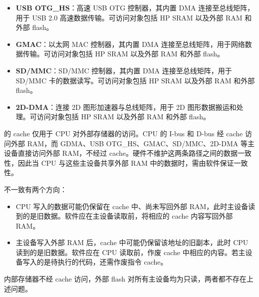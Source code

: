 \documentclass[main\_\_CN.tex]{subfiles}
\begin{document}
\begin{itemize}
\begin{itemize}
            \item \textbf{GDMA-AXI}：基于 AXI 总线协议的 DMA 控制器，可访问对象包括 HP SRAM 以及外部 RAM 和外部 flash。
        \end{itemize}
        GDMA 通过这些总线进行高速数据传输，包括外设到存储器、存储器到外设以及存储器到存储器的传输。针对 DMA 访问外部存储器的场景，为确保数据吞吐率，建议尽可能设置较长的 burst 长度。
    \item \textbf{USB OTG\_HS}：高速 USB OTG 控制器，其内置 DMA 连接至总线矩阵，用于 USB 2.0 高速数据传输。可访问对象包括 HP SRAM 以及外部 RAM 和外部 flash。
    \item \textbf{GMAC}：以太网 MAC 控制器，其内置 DMA 连接至总线矩阵，用于网络数据传输。可访问对象包括 HP SRAM 以及外部 RAM 和外部 flash。
    \item \textbf{SD/MMC}：SD/MMC 控制器，其内置 DMA 连接至总线矩阵，用于 SD/MMC 卡的数据读写。可访问对象包括 HP SRAM 以及外部 RAM 和外部 flash。
    \item \textbf{2D-DMA}：连接 2D 图形加速器与总线矩阵，用于 2D 图形数据搬运和处理。可访问对象包括 HP SRAM 以及外部 RAM 和外部 flash。
\end{itemize}

\chipname{} 的 cache 仅用于 CPU 对外部存储器的访问。CPU 的 I-bus 和 D-bus 经 cache 访问外部 RAM，而 GDMA、USB OTG\_HS、GMAC、SD/MMC、2D-DMA 等主设备直接访问外部 RAM，不经过 cache。硬件不维护这两条路径之间的数据一致性，因此当 CPU 与这些主设备共享外部 RAM 中的数据时，需由软件保证一致性。

不一致有两个方向：

\begin{itemize}
    \item CPU 写入的数据可能仍保留在 cache 中、尚未写回外部 RAM，此时主设备读到的是旧数据。软件应在主设备读取前，将相应的 cache 内容写回外部 RAM。
    \item 主设备写入外部 RAM 后，cache 中可能仍保留该地址的旧副本，此时 CPU 读到的是旧数据。软件应在 CPU 读取前，作废 cache 中相应的内容。若主设备写入的是待执行的代码，还需作废指令 cache。
\end{itemize}

内部存储器不经 cache 访问，外部 flash 对所有主设备均为只读，两者都不存在上述问题。
\end{document}
